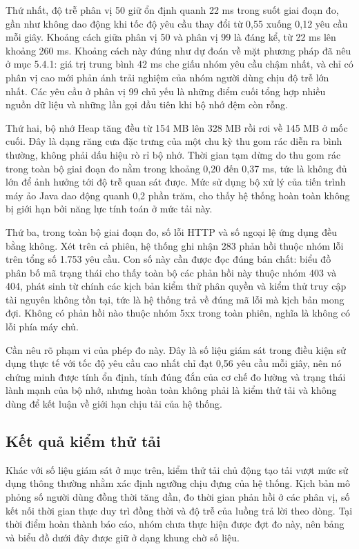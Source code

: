 \documentclass[12pt,a4paper,oneside]{report}
\begin{document}
Thứ nhất, độ trễ phân vị 50 giữ ổn định quanh 22 ms trong suốt giai đoạn đo, gần như không dao động khi tốc độ yêu cầu thay đổi từ 0,55 xuống 0,12 yêu cầu mỗi giây. Khoảng cách giữa phân vị 50 và phân vị 99 là đáng kể, từ 22 ms lên khoảng 260 ms. Khoảng cách này đúng như dự đoán về mặt phương pháp đã nêu ở mục 5.4.1: giá trị trung bình 42 ms che giấu nhóm yêu cầu chậm nhất, và chỉ có phân vị cao mới phản ánh trải nghiệm của nhóm người dùng chịu độ trễ lớn nhất. Các yêu cầu ở phân vị 99 chủ yếu là những điểm cuối tổng hợp nhiều nguồn dữ liệu và những lần gọi đầu tiên khi bộ nhớ đệm còn rỗng.

Thứ hai, bộ nhớ Heap tăng đều từ 154 MB lên 328 MB rồi rơi về 145 MB ở mốc cuối. Đây là dạng răng cưa đặc trưng của một chu kỳ thu gom rác diễn ra bình thường, không phải dấu hiệu rò rỉ bộ nhớ. Thời gian tạm dừng do thu gom rác trong toàn bộ giai đoạn đo nằm trong khoảng 0,20 đến 0,37 ms, tức là không đủ lớn để ảnh hưởng tới độ trễ quan sát được. Mức sử dụng bộ xử lý của tiến trình máy ảo Java dao động quanh 0,2 phần trăm, cho thấy hệ thống hoàn toàn không bị giới hạn bởi năng lực tính toán ở mức tải này.

Thứ ba, trong toàn bộ giai đoạn đo, số lỗi HTTP và số ngoại lệ ứng dụng đều bằng không. Xét trên cả phiên, hệ thống ghi nhận 283 phản hồi thuộc nhóm lỗi trên tổng số 1.753 yêu cầu. Con số này cần được đọc đúng bản chất: biểu đồ phân bố mã trạng thái cho thấy toàn bộ các phản hồi này thuộc nhóm 403 và 404, phát sinh từ chính các kịch bản kiểm thử phân quyền và kiểm thử truy cập tài nguyên không tồn tại, tức là hệ thống trả về đúng mã lỗi mà kịch bản mong đợi. Không có phản hồi nào thuộc nhóm 5xx trong toàn phiên, nghĩa là không có lỗi phía máy chủ.

Cần nêu rõ phạm vi của phép đo này. Đây là số liệu giám sát trong điều kiện sử dụng thực tế với tốc độ yêu cầu cao nhất chỉ đạt 0,56 yêu cầu mỗi giây, nên nó chứng minh được tính ổn định, tính đúng đắn của cơ chế đo lường và trạng thái lành mạnh của bộ nhớ, nhưng hoàn toàn không phải là kiểm thử tải và không dùng để kết luận về giới hạn chịu tải của hệ thống.

\subsection{Kết quả kiểm thử tải}

Khác với số liệu giám sát ở mục trên, kiểm thử tải chủ động tạo tải vượt mức sử dụng thông thường nhằm xác định ngưỡng chịu đựng của hệ thống. Kịch bản mô phỏng số người dùng đồng thời tăng dần, đo thời gian phản hồi ở các phân vị, số kết nối thời gian thực duy trì đồng thời và độ trễ của luồng trả lời theo dòng. Tại thời điểm hoàn thành báo cáo, nhóm chưa thực hiện được đợt đo này, nên bảng và biểu đồ dưới đây được giữ ở dạng khung chờ số liệu.
\end{document}
